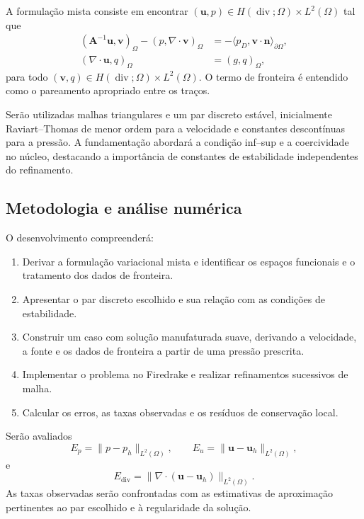 \documentclass[11pt,a4paper]{article}
\begin{document}
A formulação mista consiste em encontrar
$(\mathbf{u},p)\in H(\operatorname{div};\Omega)\times L^2(\Omega)$
tal que
\begin{equation}
    \begin{aligned}
        (\mathbf{A}^{-1}\mathbf{u},\mathbf{v})_\Omega
        -(p,\nabla\cdot\mathbf{v})_\Omega
        &=-\langle p_D,\mathbf{v}\cdot\mathbf{n}\rangle_{\partial\Omega},\\
        (\nabla\cdot\mathbf{u},q)_\Omega
        &=(g,q)_\Omega,
    \end{aligned}
\end{equation}
para todo
$(\mathbf{v},q)\in H(\operatorname{div};\Omega)\times L^2(\Omega)$.
O termo de fronteira é entendido como o pareamento apropriado entre os traços.

Serão utilizadas malhas triangulares e um par discreto estável, inicialmente Raviart--Thomas de menor ordem para a velocidade e constantes descontínuas para a pressão. A fundamentação abordará a condição inf--sup e a coercividade no núcleo, destacando a importância de constantes de estabilidade independentes do refinamento.

\subsection{Metodologia e análise numérica}

O desenvolvimento compreenderá:
\begin{enumerate}
    \item Derivar a formulação variacional mista e identificar os espaços funcionais e o tratamento dos dados de fronteira.
    \item Apresentar o par discreto escolhido e sua relação com as condições de estabilidade.
    \item Construir um caso com solução manufaturada suave, derivando a velocidade, a fonte e os dados de fronteira a partir de uma pressão prescrita.
    \item Implementar o problema no Firedrake e realizar refinamentos sucessivos de malha.
    \item Calcular os erros, as taxas observadas e os resíduos de conservação local.
\end{enumerate}

Serão avaliados
\begin{equation}
    E_p=\|p-p_h\|_{L^2(\Omega)},
    \qquad
    E_u=\|\mathbf{u}-\mathbf{u}_h\|_{L^2(\Omega)},
\end{equation}
e
\begin{equation}
    E_{\operatorname{div}}
    =
    \|\nabla\cdot(\mathbf{u}-\mathbf{u}_h)\|_{L^2(\Omega)}.
\end{equation}
As taxas observadas serão confrontadas com as estimativas de aproximação pertinentes ao par escolhido e à regularidade da solução.
\end{document}
